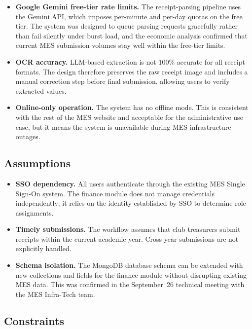 \documentclass{article}
\begin{document}
\begin{itemize}
  \item \textbf{Google Gemini free-tier rate limits.}  The receipt-parsing
    pipeline uses the Gemini API, which imposes per-minute and per-day
    quotas on the free tier.  The system was designed to queue parsing
    requests gracefully rather than fail silently under burst load, and the
    economic analysis confirmed that current MES submission volumes stay
    well within the free-tier limits.
  \item \textbf{OCR accuracy.}  LLM-based extraction is not 100\% accurate
    for all receipt formats.  The design therefore preserves the raw
    receipt image and includes a manual correction step before final
    submission, allowing users to verify extracted values.
  \item \textbf{Online-only operation.}  The system has no offline mode.
    This is consistent with the rest of the MES website and acceptable for
    the administrative use case, but it means the system is unavailable
    during MES infrastructure outages.
\end{itemize}

\subsection{Assumptions}

\begin{itemize}
  \item \textbf{SSO dependency.}  All users authenticate through the
    existing MES Single Sign-On system.  The finance module does not
    manage credentials independently; it relies on the identity established
    by SSO to determine role assignments.
  \item \textbf{Timely submissions.}  The workflow assumes that club
    treasurers submit receipts within the current academic year.
    Cross-year submissions are not explicitly handled.
  \item \textbf{Schema isolation.}  The MongoDB database schema can be
    extended with new collections and fields for the finance module without
    disrupting existing MES data.  This was confirmed in the September~26
    technical meeting with the MES Infra-Tech team.
\end{itemize}

\subsection{Constraints}
\end{document}

